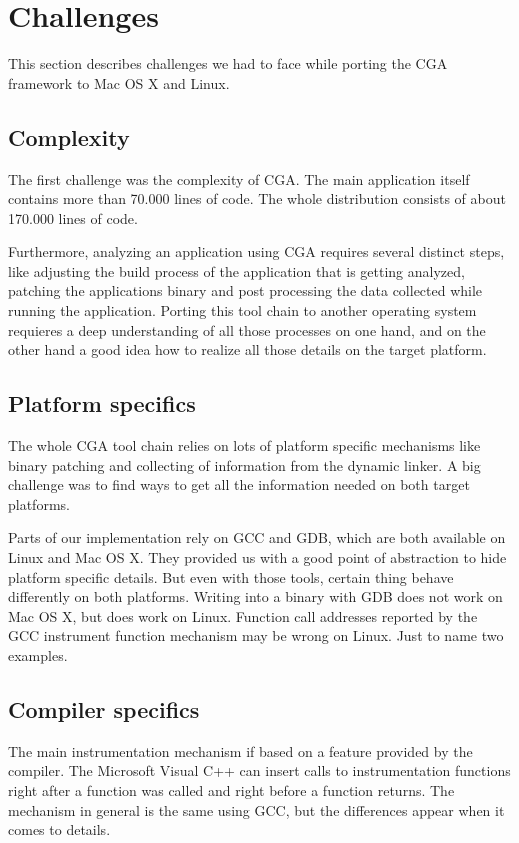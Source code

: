 \section{Challenges} This section describes challenges we had to face while porting the CGA framework to Mac OS X and Linux.

\subsection{Complexity} The first challenge was the complexity of CGA. The main application itself contains more than 70.000 lines of code. The whole distribution consists of about 170.000 lines of code. 

Furthermore, analyzing an application using CGA requires several distinct steps, like adjusting the build process of the application that is getting analyzed, patching the applications binary and post processing the data collected while running the application. Porting this tool chain to another operating system requieres a deep understanding of all those processes on one hand, and on the other hand a good idea how to realize all those details on the target platform.

\subsection{Platform specifics} The whole CGA tool chain relies on lots of platform specific mechanisms like binary patching and collecting of information from the dynamic linker. A big challenge was to find ways to get all the information needed on both target platforms. 

Parts of our implementation rely on GCC and GDB, which are both available on Linux and Mac OS X. They provided us with a good point of abstraction to hide platform specific details. But even with those tools, certain thing behave differently on both platforms. Writing into a binary with GDB does not work on Mac OS X, but does work on Linux. Function call addresses reported by the GCC instrument function mechanism may be wrong on Linux. Just to name two examples. 

\subsection{Compiler specifics} The main instrumentation mechanism if based on a feature provided by the compiler. The Microsoft Visual C++ can insert calls to instrumentation functions right after a function was called and right before a function returns. The mechanism in general is the same using GCC, but the differences appear when it comes to details. 


